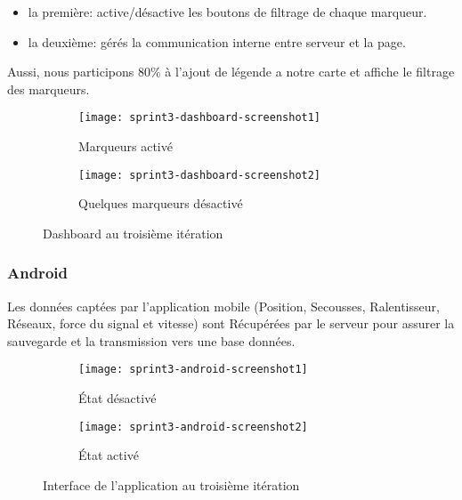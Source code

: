 \begin{itemize}
    \item la première: active/désactive les boutons de filtrage de chaque
        marqueur.
    \item la deuxième: gérés la communication interne entre serveur et la page.
\end{itemize}

Aussi, nous participons 80\% à l'ajout de légende a notre carte et affiche le
filtrage des marqueurs.

\begin{figure}[H]
\centering
    \begin{subfigure}{.7\textwidth}
    \centering
  \centering
  \texttt{[image: sprint3-dashboard-screenshot1]}
  \caption{Marqueurs activé}
\label{fig:sprint3-dashboard-screenshot1}
\end{subfigure}
\begin{subfigure}{.7\textwidth}
    \centering
  \centering
  \texttt{[image: sprint3-dashboard-screenshot2]}
  \caption{Quelques marqueurs désactivé}
\label{sprint3-dashboard-screenshot2}
\end{subfigure}
\caption{Dashboard  au troisième itération}
\end{figure}

\subsubsection{Android}

Les données captées par l'application mobile (Position, Secousses,
Ralentisseur, Réseaux, force du signal et vitesse) sont Récupérées par le
serveur pour assurer la sauvegarde et la transmission vers une base données.

\begin{figure}[H]
\centering
    \begin{subfigure}{.4\textwidth}
    \centering
  \centering
  \texttt{[image: sprint3-android-screenshot1]}
  \caption{État désactivé}
\label{fig:sprint3-android-screenshot1}
\end{subfigure}
\begin{subfigure}{.4\textwidth}
    \centering
  \centering
  \texttt{[image: sprint3-android-screenshot2]}
  \caption{État activé}
\label{fig:sprint3-android-screenshot2}
\end{subfigure}
\caption{Interface de l'application au troisième itération}
\end{figure}

